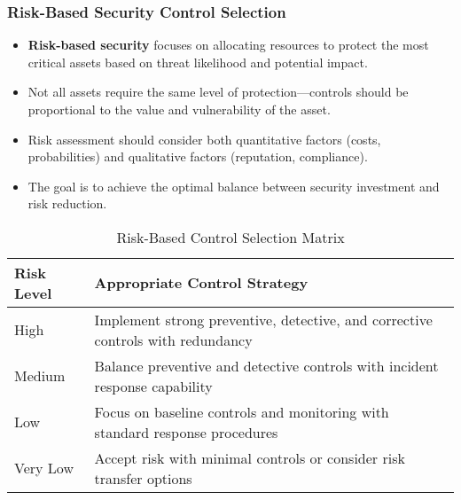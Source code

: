 \documentclass{beamer}
\begin{document}
\begin{frame}
    \frametitle{Risk-Based Security Control Selection}
    \begin{itemize}
        \item \textbf{Risk-based security} focuses on allocating resources to protect the most critical assets based on threat likelihood and potential impact.
        \item Not all assets require the same level of protection—controls should be proportional to the value and vulnerability of the asset.
        \item Risk assessment should consider both quantitative factors (costs, probabilities) and qualitative factors (reputation, compliance).
        \item The goal is to achieve the optimal balance between security investment and risk reduction.
    \end{itemize}
    
    \small
    \begin{table}
        \centering
        \begin{tabular}{|l|p{}|}
            \hline
            \textbf{Risk Level} & \textbf{Appropriate Control Strategy} \\
            \hline
            High & Implement strong preventive, detective, and corrective controls with redundancy \\
            \hline
            Medium & Balance preventive and detective controls with incident response capability \\
            \hline
            Low & Focus on baseline controls and monitoring with standard response procedures \\
            \hline
            Very Low & Accept risk with minimal controls or consider risk transfer options \\
            \hline
        \end{tabular}
        \caption{Risk-Based Control Selection Matrix}
    \end{table}
\end{frame}
\end{document}
